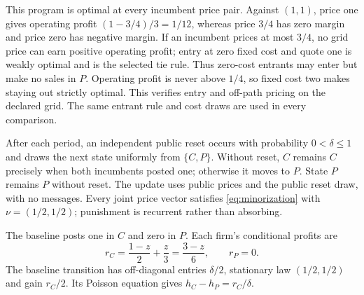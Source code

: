 \documentclass[11pt,a4paper]{article}
\begin{document}
This program is optimal at every incumbent price pair. Against $(1,1)$,
price one gives operating profit $(1-3/4)/3=1/12$, whereas price $3/4$
has zero margin and price zero has negative margin. If an incumbent prices
at most $3/4$, no grid price can earn positive operating profit; entry at
zero fixed cost and quote one is weakly optimal and is the selected tie rule.
Thus zero-cost entrants may enter but make no sales in $P$. Operating profit
is never above $1/4$, so fixed cost two makes staying out strictly optimal.
This verifies entry and off-path pricing on the declared grid. The same
entrant rule and cost draws are used in every comparison.

After each period, an independent public reset occurs with probability
$0<\delta\leq1$ and draws the next state uniformly from $\{C,P\}$.
Without reset, $C$ remains $C$ precisely when both incumbents posted one;
otherwise it moves to $P$. State $P$ remains $P$ without reset. The update
uses public prices and the public reset draw, with no messages. Every joint
price vector satisfies \eqref{eq:minorization} with $\nu=(1/2,1/2)$;
punishment is recurrent rather than absorbing.

The baseline posts one in $C$ and zero in $P$. Each firm's conditional profits
are
\[
 r_C=\frac{1-z}{2}+\frac z3=\frac{3-z}{6},\qquad r_P=0.
\]
The baseline transition has off-diagonal entries $\delta/2$, stationary law
$(1/2,1/2)$ and gain $r_C/2$. Its Poisson equation gives
$h_C-h_P=r_C/\delta$.
\end{document}
